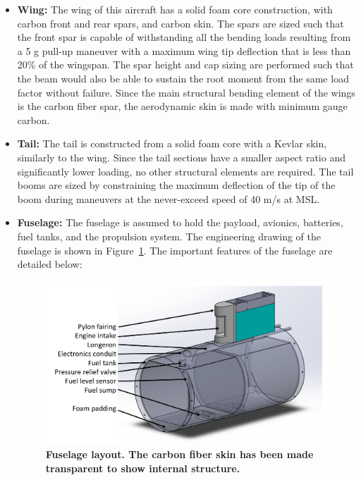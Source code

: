 \documentclass[journal]{aiaa-tc}%
\begin{document}
\begin{itemize}
    \item \textbf{Wing: } The wing of this aircraft has a solid foam core construction, with carbon front and rear spars, and carbon skin. The spars are sized such that the front spar is capable of withstanding all the bending loads resulting from a 5 g pull-up maneuver with a maximum wing tip deflection that is less than 20\% of the wingspan. The spar height and cap sizing are performed such that the beam would also be able to sustain the root moment from the same load factor without failure. Since the main structural bending element of the wings is the carbon fiber spar, the aerodynamic skin is made with minimum gauge carbon. 
    
    \item \textbf{Tail: } The tail is constructed from a solid foam core with a Kevlar skin, similarly to the wing. Since the tail sections have a smaller aspect ratio and significantly lower loading, no other structural elements are required. The tail booms are sized by constraining the maximum deflection of the tip of the boom during maneuvers at the never-exceed speed of 40 m/s at MSL. 
    
    \item \textbf{Fuselage: } The fuselage is assumed to hold the payload, avionics, batteries, fuel tanks, and the propulsion system. The engineering drawing of the fuselage is shown in Figure~\ref{f:fuselage}. The important features of the fuselage are detailed below: 

    \begin{figure}[h!]
        \begin{center}
        \includegraphics[width = .75\textwidth]{fuselageLabeled}
         \caption{ \textbf{Fuselage layout. The carbon fiber skin has been made transparent to show internal structure.} }
          \label{f:fuselage}
         \end{center}
    \end{figure}
    

\end{itemize}
\end{document}
